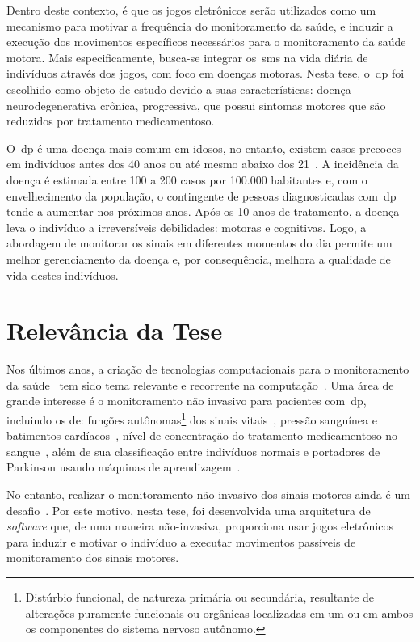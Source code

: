 Dentro deste contexto, é que os jogos eletrônicos serão utilizados como um mecanismo para motivar a frequência do monitoramento da saúde, e induzir a execução dos movimentos específicos necessários para o monitoramento da saúde motora. Mais especificamente, busca-se integrar os~\ac{sms} na vida diária de indivíduos através dos jogos, com foco em doenças motoras. Nesta tese, o~\ac{dp} foi escolhido como objeto de estudo devido a suas características: doença neurodegenerativa crônica, progressiva, que possui sintomas motores que são reduzidos por tratamento medicamentoso. 

O~\ac{dp} é uma doença mais comum em idosos, no entanto, existem casos precoces em indivíduos antes dos 40 anos ou até mesmo abaixo dos 21~\cite{menezes2003}. A incidência da doença é estimada entre 100 a 200 casos por 100.000 habitantes e, com o envelhecimento da população, o contingente de pessoas diagnosticadas com~\ac{dp} tende a aumentar nos próximos anos. Após os 10 anos de tratamento, a doença leva o indivíduo a irreversíveis debilidades: motoras e cognitivas. Logo, a abordagem de monitorar os sinais em diferentes momentos do dia permite um melhor gerenciamento da doença e, por consequência, melhora a qualidade de vida destes indivíduos.


\section{Relevância da Tese}\label{section:relevancia}
Nos últimos anos, a criação de tecnologias computacionais para o monitoramento da saúde~\cite{bardram2008} tem sido tema relevante e recorrente na computação~\cite{bradmonitor2015,compapproachparkinson2015,mazilu2015}. Uma área de grande interesse é o monitoramento não invasivo para pacientes com~\ac{dp}, incluindo os de: funções autônomas\footnote{Distúrbio funcional, de natureza primária ou secundária, resultante de alterações  puramente funcionais ou orgânicas localizadas em um  ou em ambos os componentes do sistema nervoso autônomo.} dos sinais vitais~\cite{autonomparkin2015}, pressão sanguínea e batimentos cardíacos~\cite{bloodnoninvasiveparkinson2013}, nível de concentração do tratamento medicamentoso no sangue~\cite{bloodparkinsonsonivansive2015}, além de sua classificação entre indivíduos normais e portadores de Parkinson usando máquinas de aprendizagem~\cite{compapproachparkinson2015,bradmonitor2015,classifiersparkinson2014}. 

No entanto, realizar o monitoramento não-invasivo dos sinais motores ainda é um desafio~\cite{wiiassesspark2016,reviewassesenspark2015}. Por este motivo, nesta tese, foi desenvolvida uma arquitetura de \textit{software} que, de uma maneira não-invasiva, proporciona usar jogos eletrônicos para induzir e motivar o indivíduo a executar movimentos passíveis de monitoramento dos sinais motores. 

